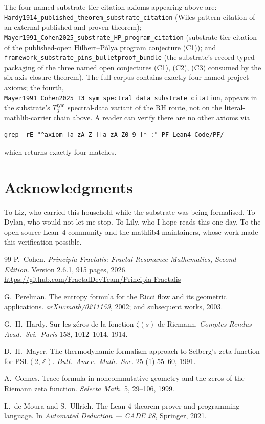 \documentclass[11pt,a4paper]{amsart}
\theoremstyle{plain}
\theoremstyle{definition}
\begin{document}
The four named substrate-tier citation axioms appearing above are: \texttt{Hardy1914\_published\_theorem\_substrate\_citation} (Wiles-pattern citation of an external published-and-proven theorem); \texttt{Mayer1991\_Cohen2025\_substrate\_HP\_program\_citation} (substrate-tier citation of the published-open Hilbert--P\'olya program conjecture (C1)); and \texttt{framework\_substrate\_pins\_bulletproof\_bundle} (the substrate's record-typed packaging of the three named open conjectures (C1), (C2), (C3) consumed by the six-axis closure theorem). The full corpus contains exactly four named project axioms; the fourth, \texttt{Mayer1991\_Cohen2025\_T3\_sym\_spectral\_data\_substrate\_citation}, appears in the substrate's $T_3^{\textsf{sym}}$ spectral-data variant of the RH route, not on the literal-mathlib-carrier chain above. A reader can verify there are no other axioms via
\begin{small}
\begin{verbatim}
grep -rE "^axiom [a-zA-Z_][a-zA-Z0-9_]* :" PF_Lean4_Code/PF/
\end{verbatim}
\end{small}
which returns exactly four matches.

\section*{Acknowledgments}

To Liz, who carried this household while the substrate was being formalised. To Dylan, who would not let me stop. To Lily, who I hope reads this one day. To the open-source Lean~4 community and the mathlib4 maintainers, whose work made this verification possible.

\begin{thebibliography}{99}
P.~Cohen.
\newblock \emph{Principia Fractalis: Fractal Resonance Mathematics, Second Edition}.
\newblock Version 2.6.1, 915 pages, 2026.
\newblock \url{https://github.com/FractalDevTeam/Principia-Fractalis}

G.~Perelman.
\newblock The entropy formula for the Ricci flow and its geometric applications.
\newblock \emph{arXiv:math/0211159}, 2002; and subsequent works, 2003.

G.~H.~Hardy.
\newblock Sur les z\'eros de la fonction $\zeta(s)$ de Riemann.
\newblock \emph{Comptes Rendus Acad.\ Sci.\ Paris} 158, 1012--1014, 1914.

D.~H.~Mayer.
\newblock The thermodynamic formalism approach to Selberg's zeta function for $\mathrm{PSL}(2,\mathbb{Z})$.
\newblock \emph{Bull.\ Amer.\ Math.\ Soc.} 25 (1) 55--60, 1991.

A.~Connes.
\newblock Trace formula in noncommutative geometry and the zeros of the Riemann zeta function.
\newblock \emph{Selecta Math.} 5, 29--106, 1999.

L.~de Moura and S.~Ullrich.
\newblock The Lean 4 theorem prover and programming language.
\newblock In \emph{Automated Deduction --- CADE 28}, Springer, 2021.

\end{thebibliography}
\end{document}
